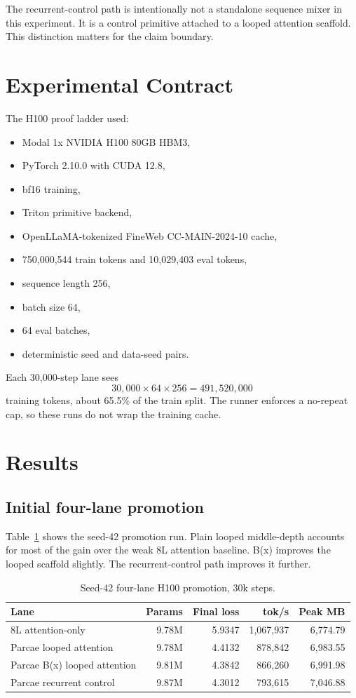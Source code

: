 \documentclass[11pt]{article}
\newcommand{\parcae}{Parcae}
\newcommand{\bx}{B(x)}
\begin{document}
The recurrent-control path is intentionally not a standalone sequence mixer in
this experiment. It is a control primitive attached to a looped attention
scaffold. This distinction matters for the claim boundary.

\section{Experimental Contract}

The H100 proof ladder used:

\begin{itemize}
  \item Modal 1x NVIDIA H100 80GB HBM3,
  \item PyTorch 2.10.0 with CUDA 12.8,
  \item bf16 training,
  \item Triton primitive backend,
  \item OpenLLaMA-tokenized FineWeb CC-MAIN-2024-10 cache,
  \item 750,000,544 train tokens and 10,029,403 eval tokens,
  \item sequence length 256,
  \item batch size 64,
  \item 64 eval batches,
  \item deterministic seed and data-seed pairs.
\end{itemize}

Each 30,000-step lane sees
\[
  30{,}000 \times 64 \times 256 = 491{,}520{,}000
\]
training tokens, about 65.5\% of the train split. The runner enforces a
no-repeat cap, so these runs do not wrap the training cache.

\section{Results}

\subsection{Initial four-lane promotion}

Table~\ref{tab:promotion} shows the seed-42 promotion run. Plain looped
middle-depth accounts for most of the gain over the weak 8L attention baseline.
\bx{} improves the looped scaffold slightly. The recurrent-control path
improves it further.

\begin{table}[h]
\centering
\caption{Seed-42 four-lane H100 promotion, 30k steps.}
\label{tab:promotion}
\begin{tabular}{lrrrr}
\toprule
Lane & Params & Final loss & tok/s & Peak MB \\
\midrule
8L attention-only & 9.78M & 5.9347 & 1,067,937 & 6,774.79 \\
\parcae{} looped attention & 9.78M & 4.4132 & 878,842 & 6,983.55 \\
\parcae{} \bx{} looped attention & 9.81M & 4.3842 & 866,260 & 6,991.98 \\
\parcae{} recurrent control & 9.87M & 4.3012 & 793,615 & 7,046.88 \\
\bottomrule
\end{tabular}
\end{table}
\end{document}
